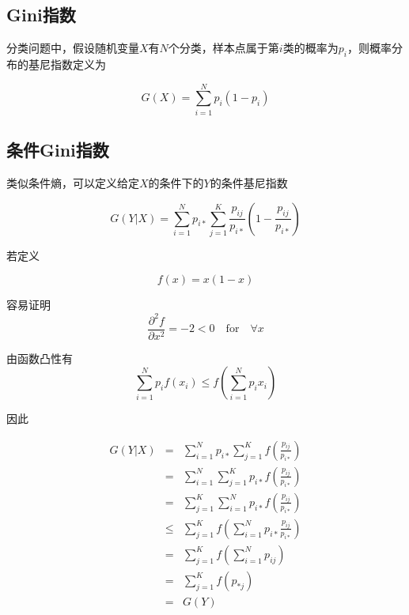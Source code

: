 \subsection{Gini指数}

分类问题中，假设随机变量$X$有$N$个分类，样本点属于第$i$类的概率为$p_i$，则概率分布的基尼指数定义为

\begin{equation*}
    G(X) = \sum_{i=1}^Np_i(1-p_i)
\end{equation*}

\subsection{条件Gini指数}

类似条件熵，可以定义给定$X$的条件下的$Y$的条件基尼指数

\begin{equation*}
    G(Y|X) = \sum_{i=1}^Np_{i*}\sum_{j=1}^K\frac{p_{ij}}{p_{i*}}(1 - \frac{p_{ij}}{p_{i*}})
\end{equation*}

若定义

\begin{equation*}
    f(x) = x(1 - x)
\end{equation*}

容易证明
\begin{equation*}
    \frac{\partial^2 f}{\partial x^2} = -2 < 0 \quad \text{for} \quad \forall x
\end{equation*}

由函数凸性有
\begin{equation*}
    \sum_{i=1}^N p_i f(x_i) \leq f(\sum_{i=1}^N p_i x_i)
\end{equation*}

因此

\begin{equation*}
    \begin{array}{rcl}
        G(Y|X) & =    & \sum_{i=1}^Np_{i*}\sum_{j=1}^Kf(\frac{p_{ij}}{p_{i*}}) \\
               & =    & \sum_{i=1}^N\sum_{j=1}^Kp_{i*}f(\frac{p_{ij}}{p_{i*}}) \\
               & =    & \sum_{j=1}^K\sum_{i=1}^Np_{i*}f(\frac{p_{ij}}{p_{i*}}) \\
               & \leq & \sum_{j=1}^Kf(\sum_{i=1}^Np_{i*}\frac{p_{ij}}{p_{i*}}) \\
               & =    & \sum_{j=1}^Kf(\sum_{i=1}^Np_{ij})                      \\
               & =    & \sum_{j=1}^Kf(p_{*j})                                  \\
               & =    & G(Y)
    \end{array}
\end{equation*}

